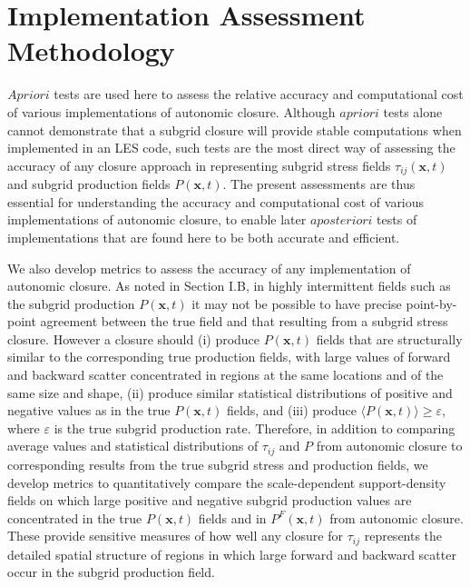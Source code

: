 \graphicspath{ {./Ch4/}  } 



\chapter{Implementation Assessment Methodology}

$A priori$ tests are used here to assess the relative accuracy and computational cost of various implementations of autonomic closure. Although $a priori$ tests alone cannot demonstrate that a subgrid closure will provide stable computations when implemented in an LES code, such tests are the most direct way of assessing the accuracy of any closure approach in representing subgrid stress fields $\tau_{ij}(\mathbf{x},t)$  and subgrid production fields $P(\mathbf{x},t)$. The present assessments are thus essential for understanding the accuracy and computational cost of various implementations of autonomic closure, to enable later $a posteriori$ tests of implementations that are found here to be both accurate and efficient. 

We also develop metrics to assess the accuracy of any implementation of autonomic closure. As noted in Section I.B, in highly intermittent fields such as the subgrid production $P(\mathbf{x},t)$ it may not be possible to have precise point-by-point agreement between the true field and that resulting from a subgrid stress closure. However a closure should (i) produce $P(\mathbf{x},t)$  fields that are structurally similar to the corresponding true production fields, with large values of forward and backward scatter concentrated in regions at the same locations and of the same size and shape, (ii) produce similar statistical distributions of positive and negative values as in the true  $P(\mathbf{x},t)$ fields, and (iii) produce $\langle P(\mathbf{x},t) \rangle \geq \varepsilon$, where  $\varepsilon$ is the true subgrid production rate. Therefore, in addition to comparing average values and statistical distributions of $\tau_{ij}$ and $P$ from autonomic closure to corresponding results from the true subgrid stress and production fields, we develop metrics to quantitatively compare the scale-dependent support-density fields on which large positive and negative subgrid production values are concentrated in the true $P(\mathbf{x},t)$  fields and in  $P^{F}(\mathbf{x},t)$ from autonomic closure. These provide sensitive measures of how well any closure for $\tau_{ij}$  represents the detailed spatial structure of regions in which large forward and backward scatter occur in the subgrid production field.
 

